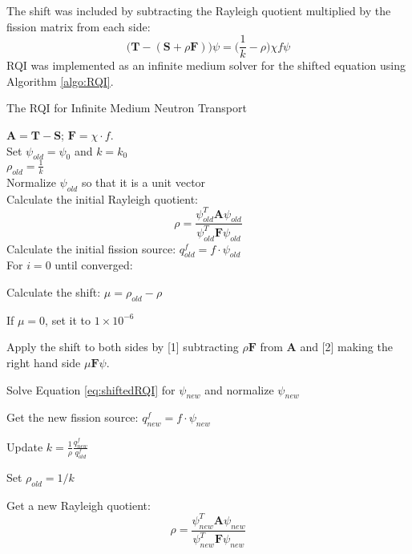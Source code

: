 \documentclass[12pt, letterpaper]{article}
\newcommand{\ve}[1]{\ensuremath{\mathbf{#1}}}
\begin{document}
The shift was included by subtracting the Rayleigh quotient multiplied by the fission matrix from each side:
\begin{equation}
 \bigl( \ve{T} - (\ve{S} + \rho \ve{F})\bigr) \psi = \bigl(\frac{1}{k} - \rho\bigr)\chi f \psi
 \label{eq:shiftedRQI}
\end{equation}
%
RQI was implemented as an infinite medium solver for the shifted equation using Algorithm \ref{algo:RQI}. 
%
\begin{algorithm}
\caption{The RQI for Infinite Medium Neutron Transport}
  $\ve{A} = \ve{T} - \ve{S}$; $\ve{F} = \chi \cdot f$.\\
  Set $\psi_{old} = \psi_{0}$ and $k = k_{0}$\\
  $\rho_{old} = \frac{1}{k}$ \\
  Normalize $\psi_{old}$ so that it is a unit vector \\
  Calculate the initial Rayleigh quotient: 
  \begin{equation}
    \rho = \frac{\psi_{old}^{T}\ve{A}\psi_{old}}{\psi_{old}^{T} \ve{F} \psi_{old}} \nonumber
  \end{equation}
  Calculate the initial fission source: $q^{f}_{old} = f \cdot \psi_{old}$ \\
  For $i = 0$ until converged:
  \begin{list}{}{\hspace{2em}}
     \item Calculate the shift: $\mu = \rho_{old} - \rho$
     \item If $\mu = 0$, set it to $1 \times 10^{-6}$
     \item Apply the shift to both sides by [1] subtracting $\rho \ve{F}$ from $\ve{A}$ and [2] making the right hand side $\mu \ve{F} \psi$.
     \item Solve Equation \eqref{eq:shiftedRQI} for $\psi_{new}$ and normalize $\psi_{new}$
     \item Get the new fission source: $q^{f}_{new} = f \cdot \psi_{new}$
     \item Update $k = \frac{1}{\rho} \frac{q^{f}_{new}}{q^{f}_{old}}$
     \item Set $\rho_{old} = 1/k$
     \item Get a new Rayleigh quotient: 
     \begin{equation}
       \rho = \frac{\psi_{new}^{T}\ve{A}\psi_{new}}{\psi_{new}^{T} \ve{F} \psi_{new}} \nonumber
     \end{equation}
  \end{list}
  \label{algo:RQI}
\end{algorithm}
\end{document}

